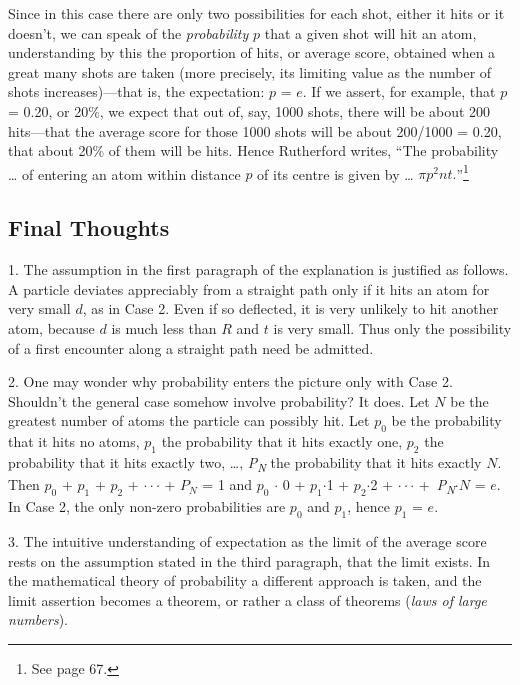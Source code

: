 Since in this case there are only two possibilities for each shot,
either it hits or it doesn't, we can speak of the \emph{probability}
$p$ that a given shot will hit an atom, understanding by this the
proportion of hits, or average score, obtained when a great many shots
are taken (more precisely, its limiting value as the number of shots
increases)---that is, the expectation: $p$ = $e$. If we
assert, for example, that $p$ = 0.20, or 20\%, we expect that out
of, say, 1000 shots, there will be about 200 hits---that the average
score for those 1000 shots will be about 200/1000 = 0.20, that about
20\% of them will be hits. Hence Rutherford writes, ``The probability
\ldots{} of entering an atom within distance $p$ of its centre is
given by \ldots{} $\pi p^{2}nt.$''\footnote{See page
  67.}

\subsection*{Final Thoughts}

1. The assumption in the first paragraph of the explanation is
justified as follows. A particle deviates appreciably from a straight
path only if it hits an atom for very small $d$, as in Case 2. Even
if so deflected, it is very unlikely to hit another atom, because
$d$ is much less than $R$ and $t$ is very small. Thus
only the possibility of a first encounter along a straight path need be
admitted.

2. One may wonder why probability enters the picture only with Case 2.
Shouldn't the general case somehow involve probability? It does. Let
$N$ be the greatest number of atoms the particle can possibly hit.
Let $p_0$ be the probability that it hits no atoms,
$p_1$ the probability that it hits exactly one,
$p_2$ the probability that it hits exactly two,
\ldots{}, \emph{P\textsubscript{N}} the probability that it hits exactly
$N$. Then $p_0$ + $p_1$ +
$p_2$ + $\cdot \cdot \cdot$ + $P_N$ = 1 and
$p_0$ $\cdot$ 0 + $p_1$$\cdot$1 +
$p_2$$\cdot$2 + $\cdot \cdot \cdot$
+~\emph{P\textsubscript{N}}$\cdot$$N$ = $e$. In Case 2, the only
non-zero probabilities are $p_0$ and
$p_1$, hence $p_1$ = $e$.

3. The intuitive understanding of expectation as the limit of the
average score rests on the assumption stated in the third paragraph,
that the limit exists. In the mathematical theory of probability a
different approach is taken, and the limit assertion becomes a theorem,
or rather a class of theorems (\emph{laws of large numbers}).


